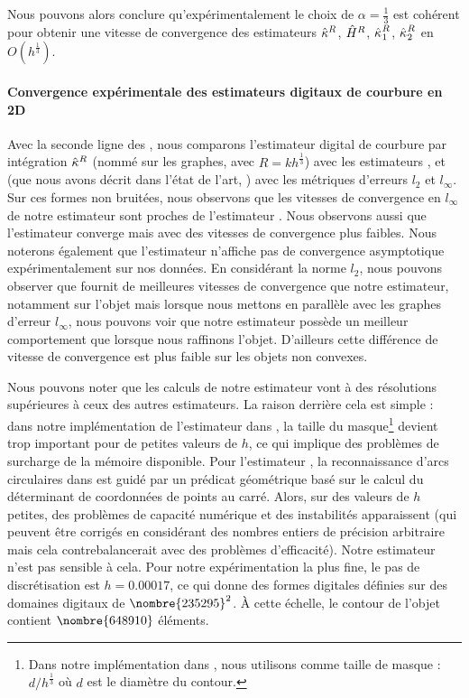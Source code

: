 \noindent Nous pouvons alors conclure qu'expérimentalement le choix de $\alpha =
\frac{1}{3}$ est cohérent pour obtenir une vitesse de convergence des
estimateurs $\hat{\kappa}^{R}$, $\hat{H}^{R}$, $\hat{\kappa_{}}_{1}^{R}$,
$\hat{\kappa_{}}_{2}^{R}$ en $O(h^\frac{1}{3})$.
%
\paragraph{Convergence expérimentale des estimateurs digitaux de courbure en 2D}
%
Avec la seconde ligne des
,
nous comparons l'estimateur digital de courbure par intégration $\hat{\kappa}^{R}$
(nommé \II sur les graphes, avec $R = kh^\frac{1}{3}$) avec les estimateurs \BC
\cite{Esbelin2011}, \MDSS \cite{Coeurjolly2001,deVieilleville2007} et \MDCA
\cite{Roussillon2011} (que nous avons décrit dans l'état de l'art,
) avec les métriques d'erreurs $l_2$ et
$l_\infty$. Sur ces formes non bruitées, nous observons que les vitesses de
convergence en $l_\infty$ de notre estimateur sont proches de l'estimateur \MDCA.
Nous observons aussi que l'estimateur \BC converge mais avec des vitesses de
convergence plus faibles. Nous noterons également que l'estimateur \MDSS
n'affiche pas de convergence asymptotique expérimentalement sur nos données. En
considérant la norme $l_2$, nous pouvons observer que \BC fournit de meilleures
vitesses de convergence que notre estimateur, notamment sur l'objet \Ellipse
mais lorsque nous mettons en parallèle avec les graphes d'erreur $l_\infty$,
nous pouvons voir que notre estimateur possède un meilleur comportement que \BC
lorsque nous raffinons l'objet. D'ailleurs cette différence de vitesse de
convergence est plus faible sur les objets non convexes.


Nous pouvons noter que les calculs de notre estimateur vont à des résolutions
supérieures à ceux des autres estimateurs. La raison derrière cela est simple :
dans notre implémentation de l'estimateur \BC dans \DGtal, la taille du
masque\footnote{Dans notre implémentation dans \DGtal, nous utilisons comme
taille de masque : $d / h^\frac{1}{3}$ où $d$ est le diamètre du contour.}
devient trop important pour de petites valeurs de $h$, ce qui implique des
problèmes de surcharge de la mémoire disponible. Pour l'estimateur \MDCA, la
reconnaissance d'arcs circulaires dans \DGtal est guidé par un prédicat
géométrique basé sur le calcul du déterminant de coordonnées de points au carré.
Alors, sur des valeurs de $h$ petites, des problèmes de capacité numérique et
des instabilités apparaissent (qui peuvent être corrigés en considérant des
nombres entiers de précision arbitraire mais cela contrebalancerait avec des
problèmes d'efficacité). Notre estimateur n'est pas sensible à cela. Pour notre
expérimentation la plus fine, le pas de discrétisation est $h = 0.00017$, ce qui
donne des formes digitales définies sur des domaines digitaux de
$\nombre{235295}^2$. À cette échelle, le contour de l'objet \Ellipse contient
$\nombre{648910}$ éléments.


